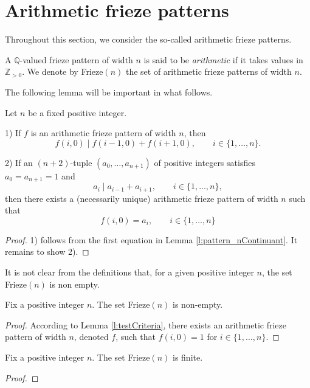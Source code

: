 \section{Arithmetic frieze patterns}
Throughout this section, we consider the so-called arithmetic frieze patterns.

\begin{definition}
    \label{def:arith-fp}
        A $\mathbb{Q}$-valued frieze pattern of width $n$ is said to be \textit{arithmetic} if it takes values in $\mathbb{Z}_{>0}$. 
        We denote by Frieze$(n)$ the set of arithmetic frieze patterns of width $n$. 
\end{definition}

The following lemma will be important in what follows. 
\begin{lemma}
    \label{l:testCriteria}
    Let $n$ be a fixed positive integer. 

    1) If $f$ is an arithmetic frieze pattern of width $n$, then
    \[
        f (i,0) \mid f (i-1,0) + f (i+1,0), \qquad i \in \{1, \ldots, n\}.
    \]

    2) If an $(n+2)$-tuple $(a_0, \ldots, a_{n+1})$ of positive integers satisfies $a_0 = a_{n+1} =1$ and 
    \[
        a_i \mid a_{i-1} + a_{i+1}, \qquad i \in \{1, \ldots, n\},
    \]
    then there exists a (necessarily unique) arithmetic frieze pattern of width $n$ such that 
    \[
        f(i,0) = a_i, \qquad i \in \{1, \ldots, n\}
    \]
\end{lemma}
\begin{proof}
    1) follows from the first equation in Lemma \ref{l:pattern_nContinuant}. It remains to show 2). 
\end{proof}

It is not clear from the definitions that, for a given positive integer $n$, the set Frieze$(n)$ is non empty.
\begin{lemma}
    \label{l:frieze-non-empty}
    Fix a positive integer $n$. The set Frieze$(n)$ is non-empty.
\end{lemma}
\begin{proof}
    According to Lemma \ref{l:testCriteria}, there exists an arithmetic frieze pattern of width $n$, denoted $f$, such 
    that $f (i,0) = 1$ for $i \in \{1,\ldots , n\}$. 
\end{proof}
\begin{proposition}
    \label{prop:frieze-finite}
    Fix a positive integer $n$. The set Frieze$(n)$ is finite. 
\end{proposition}
\begin{proof}

\end{proof}



